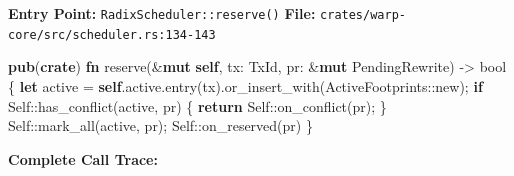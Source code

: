 \documentclass[
]{book}
\newenvironment{Shaded}{}{}
\newcommand{\ControlFlowTok}[1]{\textcolor[rgb]{0.00,0.44,0.13}{\textbf{#1}}}
\newcommand{\DataTypeTok}[1]{\textcolor[rgb]{0.56,0.13,0.00}{#1}}
\newcommand{\KeywordTok}[1]{\textcolor[rgb]{0.00,0.44,0.13}{\textbf{#1}}}
\newcommand{\NormalTok}[1]{#1}
\newcommand{\OperatorTok}[1]{\textcolor[rgb]{0.40,0.40,0.40}{#1}}
\newcommand{\PreprocessorTok}[1]{\textcolor[rgb]{0.74,0.48,0.00}{#1}}
\begin{document}
\textbf{Entry Point:} \texttt{RadixScheduler::reserve()} \textbf{File:}
\texttt{crates/warp-core/src/scheduler.rs:134-143}

\begin{Shaded}
\begin{Highlighting}[]
\KeywordTok{pub}\NormalTok{(}\KeywordTok{crate}\NormalTok{) }\KeywordTok{fn}\NormalTok{ reserve(}\OperatorTok{\&}\KeywordTok{mut} \KeywordTok{self}\OperatorTok{,}\NormalTok{ tx}\OperatorTok{:}\NormalTok{ TxId}\OperatorTok{,}\NormalTok{ pr}\OperatorTok{:} \OperatorTok{\&}\KeywordTok{mut}\NormalTok{ PendingRewrite) }\OperatorTok{{-}\textgreater{}} \DataTypeTok{bool} \OperatorTok{\{}
    \KeywordTok{let}\NormalTok{ active }\OperatorTok{=} \KeywordTok{self}\OperatorTok{.}\NormalTok{active}\OperatorTok{.}\NormalTok{entry(tx)}\OperatorTok{.}\NormalTok{or\_insert\_with(}\PreprocessorTok{ActiveFootprints::}\NormalTok{new)}\OperatorTok{;}
    \ControlFlowTok{if} \DataTypeTok{Self}\PreprocessorTok{::}\NormalTok{has\_conflict(active}\OperatorTok{,}\NormalTok{ pr) }\OperatorTok{\{}
        \ControlFlowTok{return} \DataTypeTok{Self}\PreprocessorTok{::}\NormalTok{on\_conflict(pr)}\OperatorTok{;}
    \OperatorTok{\}}
    \DataTypeTok{Self}\PreprocessorTok{::}\NormalTok{mark\_all(active}\OperatorTok{,}\NormalTok{ pr)}\OperatorTok{;}
    \DataTypeTok{Self}\PreprocessorTok{::}\NormalTok{on\_reserved(pr)}
\OperatorTok{\}}
\end{Highlighting}
\end{Shaded}

\textbf{Complete Call Trace:}
\end{document}
